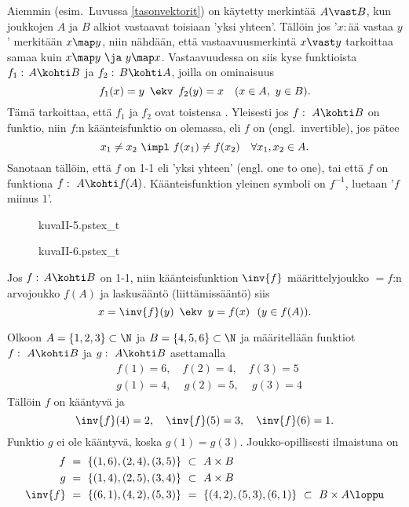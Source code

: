 Aiemmin (esim.\ Luvussa \ref{tasonvektorit}) on käytetty merkintää $A \vast B$, kun joukkojen
$A$ ja $B$ alkiot vastaavat toisiaan 'yksi yhteen'. Tällöin jos '$x$:\,ää vastaa $y$' merkitään
$x \map y$, niin nähdään, että vastaavuusmerkintä $x \vast y$ tarkoittaa samaa kuin
$x \map y\ \ja\ y \map x$. Vastaavuudessa on siis kyse funktioista $f_1:\,A \kohti B$ ja 
$f_2:\,B \kohti A$, joilla on ominaisuus
\[
f_1(x) = y\,\ \ekv\,\ f_2(y)=x \quad (x \in A,\ y \in B).
\]
Tämä tarkoittaa, että $f_1$ ja $f_2$ ovat toistensa . Yleisesti jos
$f:\ A \kohti B$ on funktio, niin $f$:n käänteisfunktio on olemassa, eli $f$ on  
(engl.\ invertible), jos pätee
\[
x_1 \neq x_2\ \impl\ f(x_1) \neq f(x_2) \quad \forall x_1,x_2 \in A.
\] 
Sanotaan tällöin, että $f$ on 1-1 eli 'yksi yhteen' (engl. one to one), tai että $f$ on
 funktiona $f:\ A \kohti f(A)$. Käänteisfunktion yleinen symboli 
on $f^{-1}$, luetaan '$f$ miinus $1$'. 
\begin{figure}[H]
\begin{center}
{kuvaII-5.pstex_t}
\end{center}
\end{figure}
\begin{figure}[H]
\begin{center}
{kuvaII-6.pstex_t}
\end{center}
\end{figure}
Jos $f:\,A \kohti B$ on 1-1, niin käänteisfunktion $\inv{f}$ määrittelyjoukko $= f$:n
arvojoukko $f(A)$ ja laskusääntö (liittämissääntö) siis 
\[ 
x=\inv{f}(y)\,\ \ekv\,\ y=f(x)\ \ (y \in f(A)).
\] 
\begin{Exa} Olkoon $A=\{1,2,3\}\subset\N$ ja $B=\{4,5,6\}\subset\N$ ja määritellään funktiot 
$f:\ A \kohti B$ ja $g:\ A \kohti B$ asettamalla
\begin{align*}
&f(1)=6,   \quad f(2)=4,     \quad f(3)=5 \\
&g(1)=4,\, \quad g(2)=5,\, \quad g(3)=4
\end{align*}
Tällöin $f$ on kääntyvä ja
\[
\inv{f}(4)=2, \quad \inv{f}(5)=3, \quad \inv{f}(6)=1.
\]
Funktio $g$ ei ole kääntyvä, koska $g(1)=g(3)$. Joukko-opillisesti ilmaistuna on
\begin{align*}
f\       &=\ \{(1,6),(2,4),(3,5)\}\ \subset\ A \times B \\
g\       &=\ \{(1,4),(2,5),(3,4)\}\ \subset\ A \times B \\
\inv{f}\ &=\ \{(6,1),(4,2),(5,3)\}\ =\ \{(4,2),(5,3),(6,1)\}\ \subset\ B \times A \loppu
\end{align*}  
\end{Exa}


